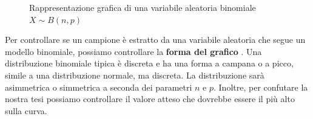 \begin{figure}[h]
    \centering
{}
    \caption{Rappresentazione grafica di una variabile aleatoria binomiale $X \sim B{(n, p)}$}
    \label{fig:mod_binom}
    \vspace{\abovedisplayskip}
\end{figure}


\noindent Per controllare se un campione è estratto da una variabile aleatoria che segue un modello binomiale, possiamo controllare la \textbf{forma del grafico} . Una distribuzione binomiale tipica è discreta e ha una forma a campana o a picco, simile a una distribuzione normale, ma discreta. La distribuzione sarà asimmetrica o simmetrica a seconda dei parametri $n$ e $p$. Inoltre, per confutare la nostra tesi possiamo controllare il valore atteso che dovrebbe essere il più alto sulla curva.

